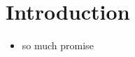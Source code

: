 \section{Introduction}
\label{sec:5.1_intro}


\begin{itemize}
    \item so much promise
\end{itemize}
